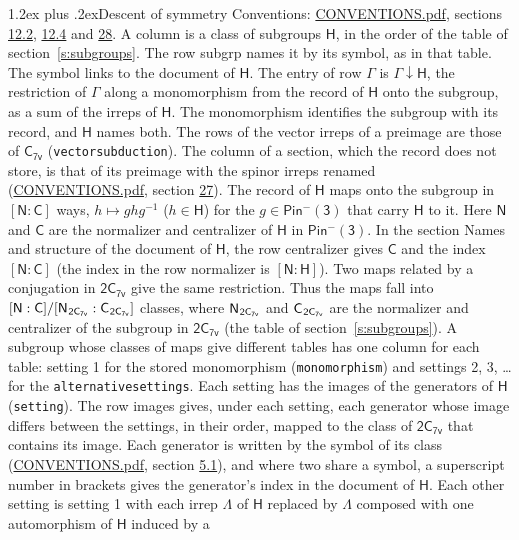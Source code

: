 \documentclass[10pt,a4paper]{article}
\makeatletter
\renewcommand\section{\@startsection{section}{1}{\z@}{-3ex plus -1ex minus -.2ex}%
  {1.2ex plus .2ex}{\normalfont\large\sffamily\bfseries\color{parttitle}}}
\numberwithin{equation}{section}
\newcommand{\grp}[1]{\mathsf{#1}}
\newcommand{\grpindex}[2]{[#1 : #2]}
\newcommand{\restr}[2]{#1\!\downarrow#2}
\newcommand{\hairsp}{\mkern1mu}
\makeatother
\begin{document}
\section{Descent of symmetry}\label{s:subduction}
Conventions: \href{../../CONVENTIONS.pdf}{CONVENTIONS.pdf}, sections \href{../../../rotation/CONVENTIONS.pdf\#conv.12.2}{12.2}, \href{../../../rotation/CONVENTIONS.pdf\#conv.12.4}{12.4} and \href{../../CONVENTIONS.pdf\#conv.28}{28}.
A column is a class of subgroups $\grp{H}$, in the order of the table of section~\ref{s:subgroups}. The row subgrp names it by its symbol, as in that table. The symbol links to the document of $\grp{H}$. The entry of row $\Gamma$ is $\restr{\Gamma}{\grp{H}}$, the restriction of $\Gamma$ along a monomorphism from the record of $\grp{H}$ onto the subgroup, as a sum of the irreps of $\grp{H}$. The monomorphism identifies the subgroup with its record, and $\grp{H}$ names both. The rows of the vector irreps of a preimage are those of \href{../../../rotation/data/pdf/C7v.pdf}{$\grp{C_{7v}}$} (\texttt{vectorsubduction}). The column of a section, which the record does not store, is that of its preimage with the spinor irreps renamed (\href{../../CONVENTIONS.pdf}{CONVENTIONS.pdf}, section \href{../../CONVENTIONS.pdf\#conv.27}{27}). \label{n:group.normalizer.o3}\label{n:group.centralizer.o3}\label{n:element.h}The record of $\grp{H}$ maps onto the subgroup in $\grpindex{\grp{N}}{\grp{C}}$ ways, $h \mapsto g h g^{-1}$ ($h \in \grp{H}$) for the $g \in \grp{Pin^{-}(3)}$ that carry $\grp{H}$ to it. Here $\grp{N}$ and $\grp{C}$ are the normalizer and centralizer of $\grp{H}$ in \href{Pinminus3.pdf}{$\grp{Pin^{-}(3)}$}. In the section Names and structure of the document of $\grp{H}$, the row centralizer gives $\grp{C}$ and the index $\grpindex{\grp{N}}{\grp{C}}$ (the index in the row normalizer is $\grpindex{\grp{N}}{\grp{H}}$). Two maps related by a conjugation in $\grp{2C_{7v}}$ give the same restriction. Thus the maps fall into $\grpindex{\grp{N}}{\grp{C}}/\grpindex{\grp{N}_{\hairsp \grp{2C_{7v}}}}{\grp{C}_{\hairsp \grp{2C_{7v}}}}$ classes, where $\grp{N}_{\hairsp \grp{2C_{7v}}}$ and $\grp{C}_{\hairsp \grp{2C_{7v}}}$ are the normalizer and centralizer of the subgroup in $\grp{2C_{7v}}$ (the table of section~\ref{s:subgroups}). \label{n:head.setting}A subgroup whose classes of maps give different tables has one column for each table: setting 1 for the stored monomorphism (\texttt{monomorphism}) and settings 2, 3, \dots{} for the \texttt{alternativesettings}. Each setting has the images of the generators of $\grp{H}$ (\texttt{setting}). \label{n:head.images}The row images gives, under each setting, each generator whose image differs between the settings, in their order, mapped to the class of $\grp{2C_{7v}}$ that contains its image. Each generator is written by the symbol of its class (\href{../../CONVENTIONS.pdf}{CONVENTIONS.pdf}, section \href{../../../rotation/CONVENTIONS.pdf\#conv.5.1}{5.1}), and where two share a symbol, a superscript number in brackets gives the generator's index in the document of $\grp{H}$. \label{n:irrep.Delta}Each other setting is setting 1 with each irrep $\Lambda$ of $\grp{H}$ replaced by $\Lambda$ composed with one automorphism of $\grp{H}$ induced by a 
\end{document}
